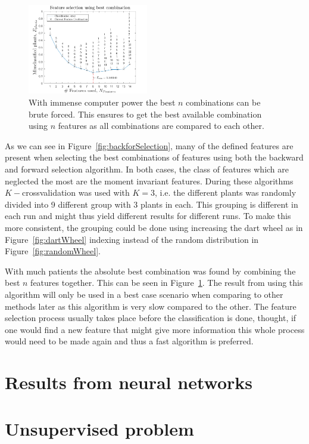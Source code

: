 \begin{figure}[H]
\centering
\includegraphics[width=0.47\textwidth]{./figure/result/Quadratic/combination.png}
\caption{\label{fig:combSelection} With immense computer power the best $n$ combinations can be brute forced. This ensures to get the best available combination using $n$ features as all combinations are compared to each other.  }
\end{figure}

As we can see in Figure~\ref{fig:backforSelection}, many of the defined features are present when selecting the best combinations of features using both the backward and forward selection algorithm. In both cases, the class of features which are neglected the most are the moment invariant features. During these algorithms $K-$crossvalidation was used with $K=3$, i.e. the different plants was randomly divided into 9 different group with 3 plants in each. This grouping is different in each run and might thus yield different results for different runs. To make this more consistent, the grouping could be done using increasing the dart wheel as in Figure~\ref{fig:dartWheel} indexing instead of the random distribution in Figure~\ref{fig:randomWheel}.

With much patients the absolute best combination was found by combining the best $n$ features together. This can be seen in Figure~\ref{fig:combSelection}. The result from using this algorithm will only be used in a best case scenario when comparing to other methods later as this algorithm is very slow compared to the other. The feature selection process usually takes place before the classification is done, thought, if one would find a new feature that might give more information this whole process would need to be made again and thus a fast algorithm is preferred.




\section{Results from neural networks}

\section{Unsupervised problem}
